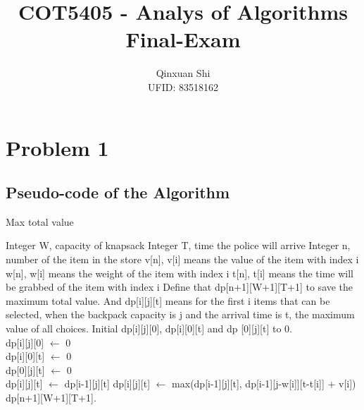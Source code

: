 \documentclass[]{article}
\title{\Huge COT5405 - Analys of Algorithms \\ Final-Exam}
\author{Qinxuan Shi \\ UFID: 83518162}
\begin{document}
	
	\maketitle
	\clearpage
	
	\section{Problem 1}
	
	\subsection{Pseudo-code of the Algorithm}
	
	\begin{algorithm}[H]
		\caption{Max total value}  
		\begin{algorithmic} 
			\Require 
			\State Integer W, capacity of knapsack
			\State Integer T, time the police will arrive
			\State Integer n, number of the item in the store
			\State v[n], v[i] means the value of the item with index i
			\State w[n], w[i] means the weight of the item with index i
			\State t[n], t[i] means the time will be grabbed of the item with index i
			\Ensure
			\State Define that dp[n+1][W+1][T+1] to save the maximum total value.
			\State And dp[i][j][t] means for the first i items that can be selected, when the backpack capacity is j and the arrival time is t, the maximum value of all choices. 
			\State Initial dp[i][j][0], dp[i][0][t] and dp [0][j][t] to 0.  \\

					\State dp[i][j][0] $\leftarrow$ 0
				\EndFor
			\EndFor  \\
			
					\State dp[i][0][t] $\leftarrow$ 0
				\EndFor
			\EndFor  \\
			
					\State dp[0][j][t] $\leftarrow$ 0
				\EndFor
			\EndFor   \\
			
							\State dp[i][j][t] $\leftarrow$ dp[i-1][j][t]
							\State dp[i][j][t] $\leftarrow$ max(dp[i-1][j][t], dp[i-1][j-w[i]][t-t[i]] + v[i])
						\EndIf
					\EndFor
				\EndFor
			\EndFor   \\
			\Return dp[n+1][W+1][T+1].
		\end{algorithmic}  
	\end{algorithm} 
\end{document}
